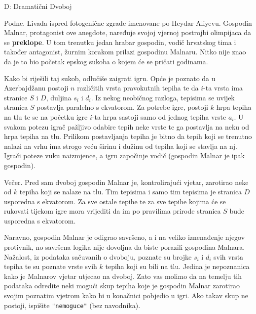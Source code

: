 
\begin{statement}[
  timelimit=1 s,
  memorylimit=512 MiB,
]{D: Dramatični Dvoboj}

Podne. Livada ispred fotogenične zgrade imenovane po Heydar Aliyevu. Gospodin
Malnar, protagonist ove anegdote, naređuje svojoj vjernoj postrojbi olimpijaca
da se \textbf{preklope}. U tom trenutku jedan hrabar gospodin, vodič hrvatskog
tima i također antagonist, žurnim korakom prilazi gospodinu Malnaru. Nitko nije
znao da je to bio početak epskog sukoba o kojem će se pričati godinama.

Kako bi riješili taj sukob, odlučiše zaigrati igru. Opće je poznato da u
Azerbajdžanu postoji $n$ različitih vrsta pravokutnih tepiha te da $i$-ta vrsta
ima stranice $S$ i $D$, duljina $s_i$ i $d_i$. Iz nekog neobičnog razloga,
tepisima se uvijek stranica $S$ postavlja paralelno s ekvatorom. Za potrebe
igre, postoji $k$ hrpa tepiha na tlu te se na početku igre $i$-ta hrpa sastoji
samo od jednog tepiha vrste $a_i$. U svakom potezu igrač pažljivo odabire tepih
neke vrste te ga postavlja na neku od hrpa tepiha na tlu. Prilikom postavljanja
tepiha je bitno da tepih koji se trenutno nalazi na vrhu ima strogo veću širinu
i dužinu od tepiha koji se stavlja na nj. Igrači poteze vuku naizmjence, a igru
započinje vodič (gospodin Malnar je ipak gospodin).

Večer. Pred sam dvoboj gospodin Malnar je, kontrolirajući vjetar, zarotirao neke
od $k$ tepiha koji se nalaze na tlu. Tim tepisima i samo tim tepisima je
stranica $D$ usporedna s ekvatorom. Za sve ostale tepihe te za sve tepihe kojima
će se rukovati tijekom igre mora vrijediti da im po pravilima prirode stranica
$S$ bude usporedna s ekvatorom.

Naravno, gospodin Malnar je odigrao savršeno, a i na veliko iznenađenje njegov
protivnik, no savršena logika nije dovoljna da biste porazili gospodina
Malnara. Nažalost, iz podataka sačuvanih o dvoboju, poznate su brojke $s_i$ i
$d_i$ svih vrsta tepiha te su poznate vrste svih $k$ tepiha koji su bili na tlu.
Jedina je nepoznanica kako je Malnarov vjetar utjecao na dvoboj. Zato vas molimo
da na temelju tih podataka odredite neki mogući skup tepiha koje je gospodin
Malnar zarotirao svojim poznatim vjetrom kako bi u konačnici pobjedio u igri.
Ako takav skup ne postoji, ispišite \texttt{"nemoguce"} (bez navodnika).


\end{statement}
